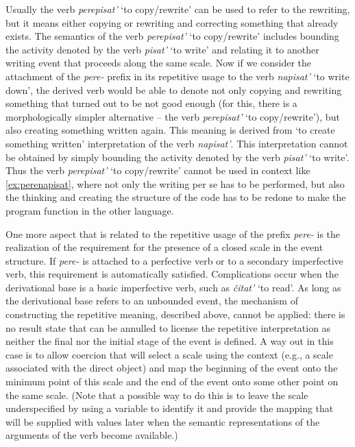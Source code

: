 Usually the verb \textit{perepisat'} `to copy/rewrite' can be used to refer to the rewriting, but it means either copying or rewriting and correcting something that already exists. The semantics of the verb \textit{perepisat'} `to copy/rewrite' includes bounding the activity denoted by the verb \textit{pisat'} `to write' and relating it to another writing event that proceeds along the same scale. Now if we consider the attachment of the \textit{pere-} prefix in its repetitive usage to the verb \textit{napisat'} `to write down', the derived verb would be able to denote not only copying and rewriting something that turned out to be not good enough (for this, there is a morphologically simpler alternative -- the verb \textit{perepisat'} `to copy/rewrite'), but also creating something written again. This meaning is derived from `to create something written' interpretation of the verb \textit{napisat'}. This interpretation cannot be obtained by simply bounding the activity denoted by the verb \textit{pisat'} `to write'. Thus the verb \textit{perepisat'} `to copy/rewrite' cannot be used in context like \ref{ex:perenapisat}, where not only the writing per se has to be performed, but also the thinking and creating the structure of the code has to be redone to make the program function in the other language.

One more aspect that is related to the repetitive usage of the prefix \textit{pere-} is the realization of the requirement for the presence of a closed scale in the event structure. If \textit{pere-} is attached to a perfective verb or to a secondary imperfective verb, this requirement is automatically satisfied. Complications occur when the derivational base is a basic imperfective verb, such as \textit{\v{c}itat'} `to read'. As long as the derivational base refers to an unbounded event, the mechanism of constructing the repetitive meaning, described above, cannot be applied: there is no result state that can be annulled to license the repetitive interpretation as neither the final nor the initial stage of the event is defined. A way out in this case is to allow coercion that will select a scale using the context (e.g., a scale associated with the direct object) and map the beginning of the event onto the minimum point of this scale and the end of the event onto some other point on the same scale. (Note that a possible way to do this is to leave the scale underspecified by using a variable to identify it and provide the mapping that will be supplied with values later when the semantic representations of the arguments of the verb become available.)

